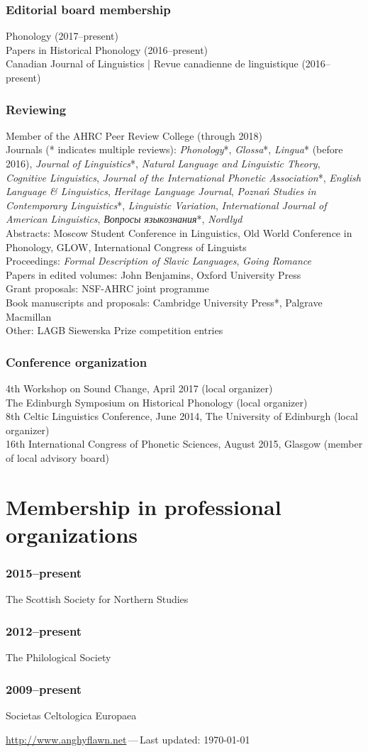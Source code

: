 \documentclass[a4paper,11pt]{article}
\newlength\blockwidth
\newcommand\textitrussian[1]{\textrussian{\textit{#1}}}
\newcommand\cvitem[1]{\hspace*{\blockwidth}\begin{minipage}[t]{\linewidth-\blockwidth}
#1
\end{minipage}\par}
\newcommand{\block}[2]{\subsubsection{#1}\cvitem{#2}}
\begin{document}
\block{Editorial board membership}{Phonology (2017--present)\\
  Papers in Historical Phonology (2016--present)\\
  Canadian Journal of Linguistics | Revue canadienne de linguistique (2016--present)}
\block{Reviewing}{Member of the AHRC Peer Review College (through 2018)\\Journals (* indicates multiple reviews): \emph{Phonology}*, \emph{Glossa}*, \emph{Lingua}* (before 2016), \emph{Journal of Linguistics}*, \emph{Natural Language and Linguistic Theory}, \emph{Cognitive Linguistics}, \emph{Journal of the International Phonetic Association}*, \emph{English Language \&{} Linguistics}, \emph{Heritage Language Journal}, \emph{Poznań Studies in Contemporary Linguistics}*, \emph{Linguistic Variation}, \emph{International Journal of American Linguistics}, \textitrussian{Вопросы языкознания}*, \emph{Nordlyd}\\
Abstracts: Moscow Student Conference in Linguistics, Old World Conference in Phonology, GLOW, International Congress of Linguists\\
Proceedings: \emph{Formal Description of Slavic Languages}, \emph{Going Romance}\\
Papers in edited volumes: John Benjamins, Oxford University Press\\
Grant proposals: NSF-AHRC joint programme\\
Book manuscripts and proposals: Cambridge University Press*, Palgrave Macmillan\\
Other: LAGB Siewerska Prize competition entries}
\block{Conference organization}{4th Workshop on Sound Change, April 2017 (local organizer)\\
  The Edinburgh Symposium on Historical Phonology (local organizer)\\
8th Celtic Linguistics Conference, June 2014, The University of Edinburgh (local organizer)\\
16th International Congress of Phonetic Sciences, August 2015, Glasgow (member of local advisory board)}

\section{Membership in professional organizations}
\block{2015--present}{The Scottish Society for Northern Studies}
\block{2012--present}{The Philological Society}
\block{2009--present}{Societas Celtologica Europaea}

\vfill{}
\hrulefill

\begin{center}
{\footnotesize \href{http://www.anghyflawn.net}{http://www.anghyflawn.net}{\,---\,}Last  updated: \today
}
\end{center}
\end{document}
